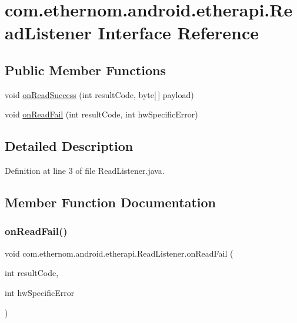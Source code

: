 \hypertarget{interfacecom_1_1ethernom_1_1android_1_1etherapi_1_1_read_listener}{}\section{com.\+ethernom.\+android.\+etherapi.\+Read\+Listener Interface Reference}
\label{interfacecom_1_1ethernom_1_1android_1_1etherapi_1_1_read_listener}
\subsection*{Public Member Functions}
\begin{DoxyCompactItemize}
\item 
void \mbox{\hyperlink{interfacecom_1_1ethernom_1_1android_1_1etherapi_1_1_read_listener_a404114d62b92d1b844bdbb189711f7e9}{on\+Read\+Success}} (int result\+Code, byte\mbox{[}$\,$\mbox{]} payload)
\item 
void \mbox{\hyperlink{interfacecom_1_1ethernom_1_1android_1_1etherapi_1_1_read_listener_af225192b167912108b242c1f8cd9f7fb}{on\+Read\+Fail}} (int result\+Code, int hw\+Specific\+Error)
\end{DoxyCompactItemize}


\subsection{Detailed Description}


Definition at line 3 of file Read\+Listener.\+java.



\subsection{Member Function Documentation}
\mbox{\label{interfacecom_1_1ethernom_1_1android_1_1etherapi_1_1_read_listener_af225192b167912108b242c1f8cd9f7fb}} 
\subsubsection{\texorpdfstring{on\+Read\+Fail()}{onReadFail()}}
{\footnotesize\ttfamily void com.\+ethernom.\+android.\+etherapi.\+Read\+Listener.\+on\+Read\+Fail (\begin{DoxyParamCaption}\item[{int}]{result\+Code,  }\item[{int}]{hw\+Specific\+Error }\end{DoxyParamCaption})}


